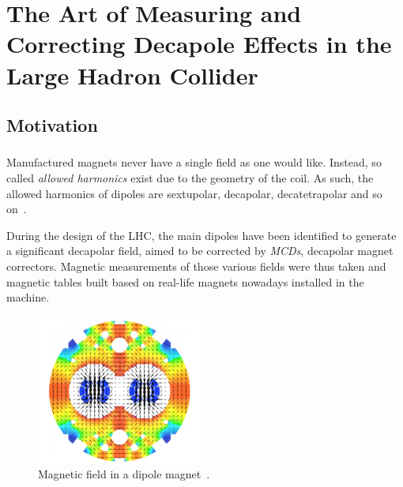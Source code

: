 \chapter{The Art of Measuring and Correcting Decapole Effects in the Large Hadron Collider}
\thumbforchapter{}
\chaptertoc{}
\newpage

\section{Motivation}

\subsection{}

Manufactured magnets never have a single field as one would like. Instead, so called 
\textit{allowed harmonics} exist due to the geometry of the coil. As such, the allowed harmonics of
dipoles are sextupolar, decapolar, decatetrapolar and so on~\cite{deniau_magnetic_2009}.

During the design of the LHC, the main dipoles have been identified to generate a significant 
decapolar field, aimed to be corrected by \textit{MCDs}, decapolar magnet correctors.
Magnetic measurements of those various fields were thus taken and magnetic tables built based on
real-life magnets nowadays installed in the machine.

\begin{figure}[H]
    \centering
    \includegraphics[width=0.5\textwidth]{./images/main_dipole_fields.png}
    \caption{Magnetic field in a dipole magnet~\cite{deniau_magnetic_2009}.}
    \label{fig:decapoles:magnetic_field_dipole}
\end{figure}


\subsection{}

